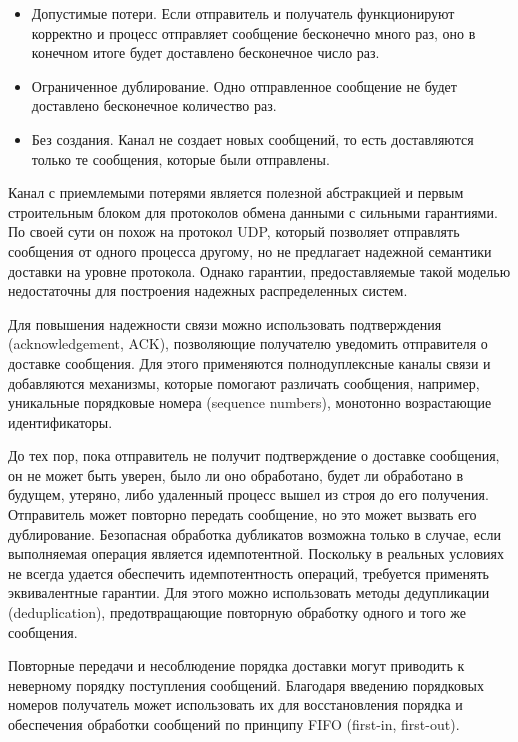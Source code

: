 \begin{itemize}
    \item Допустимые потери. Если отправитель и получатель функционируют корректно и
        процесс отправляет сообщение бесконечно много раз, оно в конечном итоге
        будет доставлено бесконечное число раз.
    \item Ограниченное дублирование. Одно отправленное сообщение не будет доставлено
        бесконечное количество раз.
    \item Без создания. Канал не создает новых сообщений, то есть доставляются
        только те сообщения, которые были отправлены.
\end{itemize}

Канал с приемлемыми потерями является полезной абстракцией и первым строительным
блоком для протоколов обмена данными с сильными гарантиями. По своей сути он похож
на протокол UDP, который позволяет отправлять сообщения от одного процесса другому,
но не предлагает надежной семантики доставки на уровне протокола. Однако гарантии,
предоставляемые такой моделью недостаточны для построения надежных распределенных
систем.

Для повышения надежности связи можно использовать подтверждения (acknowledgement,
ACK), позволяющие получателю уведомить отправителя о доставке сообщения. Для
этого применяются полнодуплексные каналы связи и добавляются механизмы,
которые помогают различать сообщения, например, уникальные порядковые номера
(sequence numbers), монотонно возрастающие идентификаторы.

До тех пор, пока отправитель не получит подтверждение о доставке сообщения,
он не может быть уверен, было ли оно обработано, будет ли обработано в будущем,
утеряно, либо удаленный процесс вышел из строя до его получения. Отправитель
может повторно передать сообщение, но это может вызвать его дублирование.
Безопасная обработка дубликатов возможна только в случае, если выполняемая
операция является идемпотентной. Поскольку в реальных условиях не всегда удается
обеспечить идемпотентность операций, требуется применять эквивалентные гарантии.
Для этого можно использовать методы дедупликации (deduplication), предотвращающие
повторную обработку одного и того же сообщения.

Повторные передачи и несоблюдение порядка доставки могут приводить к неверному
порядку поступления сообщений. Благодаря введению порядковых номеров получатель
может использовать их для восстановления порядка и обеспечения обработки сообщений
по принципу FIFO (first-in, first-out).

